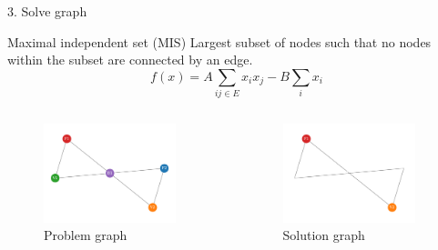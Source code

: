 \documentclass[handout]{beamer}
\begin{document}
\begin{frame}{3. Solve graph}
    \begin{alertblock}{Maximal independent set (MIS)}
        \vspace{0.1em}
        Largest subset of nodes such that no nodes within the subset are connected by an edge.
        \begin{equation*}
            f(x)=A\sum_{ij\in E}x_ix_j-B\sum_i x_i
        \end{equation*}
    \end{alertblock}
    \pause
    \begin{columns}
        \begin{column}{0.5\textwidth}
            \begin{figure}
                \includegraphics[width=0.9\textwidth]{../Figures/toy_graph.pdf}
                \caption{Problem graph}
            \end{figure}
        \end{column}
        \begin{column}{0.5\textwidth}
            \begin{figure}
                \includegraphics[width=0.9\textwidth]{../Figures/toy_solution.pdf}
                \caption{Solution graph}
            \end{figure}
        \end{column}
    \end{columns}
\end{frame}
\end{document}
